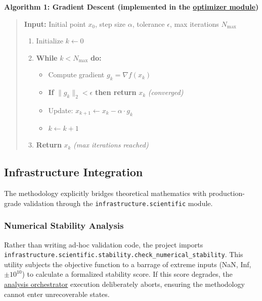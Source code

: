 \documentclass[
]{article}
\providecommand{\tightlist}{%
  \setlength{\itemsep}{0pt}\setlength{\parskip}{0pt}}
\begin{document}
\textbf{Algorithm 1: Gradient Descent (implemented in the
\href{https://github.com/docxology/template/blob/main/projects/code_project/src/optimizer.py\#L42-L138}{optimizer
module})}

\begin{quote}
\textbf{Input:} Initial point \(x_0\), step size \(\alpha\), tolerance
\(\epsilon\), max iterations \(N_{\max}\)

\begin{enumerate}
\def\labelenumi{\arabic{enumi}.}
\tightlist
\item
  Initialize \(k \leftarrow 0\)
\item
  \textbf{While} \(k < N_{\max}\) \textbf{do:}

  \begin{itemize}
  \tightlist
  \item
    Compute gradient \(g_k = \nabla f(x_k)\)
  \item
    \textbf{If} \(\|g_k\|_2 < \epsilon\) \textbf{then return} \(x_k\)
    \emph{(converged)}
  \item
    Update: \(x_{k+1} \leftarrow x_k - \alpha \cdot g_k\)
  \item
    \(k \leftarrow k + 1\)
  \end{itemize}
\item
  \textbf{Return} \(x_k\) \emph{(max iterations reached)}
\end{enumerate}
\end{quote}

\subsection{Infrastructure
Integration}\label{infrastructure-integration-1}

The methodology explicitly bridges theoretical mathematics with
production-grade validation through the
\texttt{infrastructure.scientific} module.

\subsubsection{Numerical Stability
Analysis}\label{numerical-stability-analysis}

Rather than writing ad-hoc validation code, the project imports
\texttt{infrastructure.scientific.stability.check\_numerical\_stability}.
This utility subjects the objective function to a barrage of extreme
inputs (NaN, Inf, \(\pm 10^{10}\)) to calculate a formalized stability
score. If this score degrades, the
\href{https://github.com/docxology/template/blob/main/scripts/02_run_analysis.py}{analysis
orchestrator} execution deliberately aborts, ensuring the methodology
cannot enter unrecoverable states.
\end{document}
